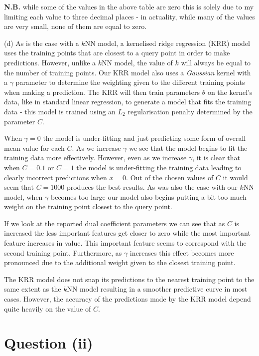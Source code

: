 \documentclass[12pt]{article}
\begin{document}
\textbf{N.B.} while some of the values in the above table are zero this is solely due to my limiting each value to three decimal places - in actuality, while many of the values are very small, none of them are equal to zero.

\noindent (d) As is the case with a $k$NN model, a kernelised ridge regression (KRR) model uses the training points that are closest to a query point in order to make predictions. However, unlike a $k$NN model, the value of $k$ will always be equal to the number of training points. Our KRR model also uses a \textit{Gaussian} kernel with a $\gamma$ parameter to determine the weighting given to the different training points when making a prediction. The KRR will then train parameters $\theta$ on the kernel's data, like in standard linear regression, to generate a model that fits the training data - this model is trained using an $L_2$ regularisation penalty determined by the parameter $C$.

When $\gamma = 0$ the model is under-fitting and just predicting some form of overall mean value for each $C$. As we increase $\gamma$ we see that the model begins to fit the training data more effectively. However, even as we increase $\gamma$, it is clear that when $C = 0.1$ or $C = 1$ the model is under-fitting the training data leading to clearly incorrect predictions when $x = 0$. Out of the chosen values of $C$ it would seem that $C = 1000$ produces the best results. As was also the case with our $k$NN model, when $\gamma$ becomes too large our model also begins putting a bit too much weight on the training point closest to the query point.

If we look at the reported dual coefficient parameters we can see that as $C$ is increased the less important features get closer to zero while the most important feature increases in value. This important feature seems to correspond with the second training point. Furthermore, as $\gamma$ increases this effect becomes more pronounced due to the additional weight given to the closest training point.

The KRR model does not snap its predictions to the nearest training point to the same extent as the $k$NN model resulting in a smoother predictive curve in most cases. However, the accuracy of the predictions made by the KRR model depend quite heavily on the value of $C$.

\section*{Question (ii)}
\end{document}
